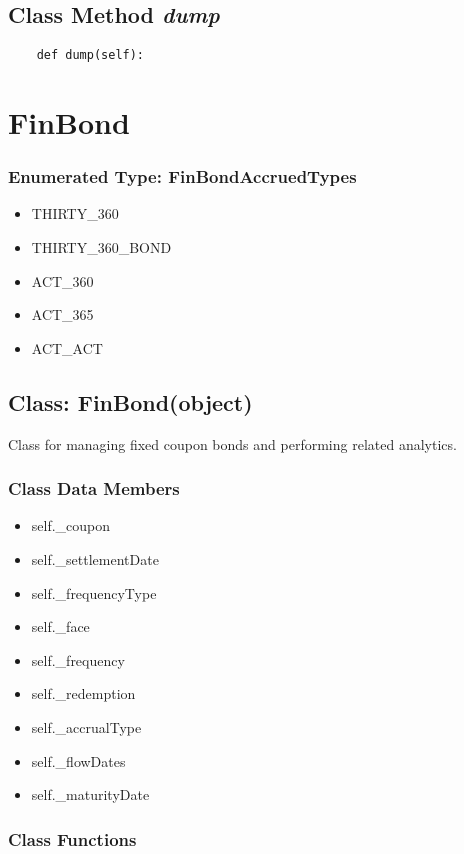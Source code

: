 \documentclass[twoside,11pt]{book}
\begin{document}
\subsection{Class Method {\it dump}}


\begin{lstlisting}
    def dump(self):
\end{lstlisting}

\newpage
\section{FinBond}

\subsubsection{Enumerated Type: FinBondAccruedTypes}
\begin{itemize}
\item{THIRTY\_360}
\item{THIRTY\_360\_BOND}
\item{ACT\_360}
\item{ACT\_365}
\item{ACT\_ACT}
\end{itemize}

\subsection{Class: FinBond(object)}
Class for managing fixed coupon bonds and performing related analytics. 

\subsubsection{Class Data Members}
\begin{itemize}
\item{self.\_coupon}
\item{self.\_settlementDate}
\item{self.\_frequencyType}
\item{self.\_face}
\item{self.\_frequency}
\item{self.\_redemption}
\item{self.\_accrualType}
\item{self.\_flowDates}
\item{self.\_maturityDate}
\end{itemize}

\subsubsection{Class Functions}
\end{document}
